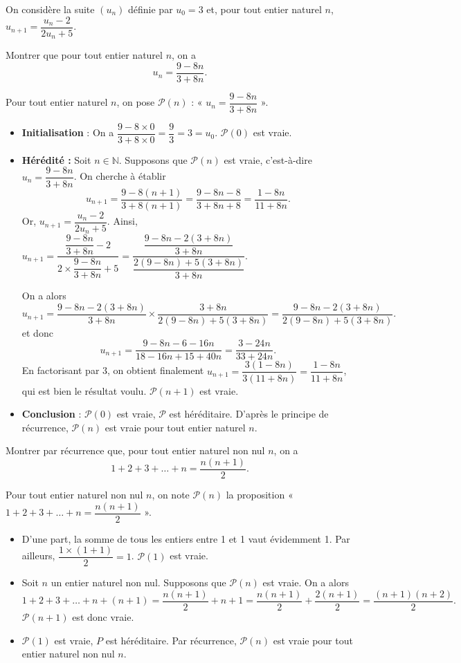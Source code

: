 \documentclass[11pt,fleqn]{book} %
\begin{document}
\begin{exercise}
On considère la suite \((u_n)\) définie par \(u_0=3\) et, pour tout entier naturel \(n\), \(u_{n+1}=\dfrac{u_n-2}{2u_n+5}\).

Montrer que pour tout entier naturel \(n\), on a \[u_n = \dfrac{9-8n}{3+8n}.\]\end{exercise}
\begin{solution}Pour tout entier naturel \(n\), on pose \(\mathcal{P}(n)\) : « \(u_n =\dfrac{9-8n}{3+8n}\) ».
\begin{itemize} \item \textbf{Initialisation} : On a \(\dfrac{9-8 \times 0}{3+8 \times 0}=\dfrac{9}{3}=3=u_0\). \(\mathcal{P}(0)\) est vraie.
\item\textbf{Hérédité :} Soit \(n\in\mathbb{N}\). Supposons que \(\mathcal{P}(n)\) est vraie, c'est-à-dire \(u_n =\dfrac{9-8n}{3+8n}\). On cherche à établir
\[u_{n+1}=\dfrac{9-8(n+1)}{3+8(n+1)}=\dfrac{9-8n-8}{3+8n+8}=\dfrac{1-8n}{11+8n}.\]
Or, \(u_{n+1}=\dfrac{u_n-2}{2u_n+5}\). Ainsi, $u_{n+1}=\dfrac{\dfrac{9-8n}{3+8n}-2}{2 \times \dfrac{9-8n}{3+8n} +5} = \dfrac{\dfrac{9-8n-2(3+8n)}{3+8n}}{\dfrac{2(9-8n)+5(3+8n)}{3+8n}}$.

On a alors
\[u_{n+1}=\dfrac{9-8n-2(3+8n)}{3+8n} \times \dfrac{3+8n}{2(9-8n)+5(3+8n)}=\dfrac{9-8n-2(3+8n)}{2(9-8n)+5(3+8n)}.\]
et donc
\[u_{n+1}=\dfrac{9-8n-6-16n}{18-16n+15+40n}=\dfrac{3-24n}{33+24n}.\]
En factorisant par 3, on obtient finalement $u_{n+1}=\dfrac{3(1-8n)}{3(11+8n)}=\dfrac{1-8n}{11+8n}$, qui est bien le résultat voulu. \(\mathcal{P}(n+1)\) est vraie.
\item \textbf{Conclusion} :  \(\mathcal{P}(0)\) est vraie, \(\mathcal{P}\) est héréditaire. D'après le principe de récurrence, \(\mathcal{P}(n)\) est vraie pour tout entier naturel \(n\).\end{itemize}\end{solution}


\begin{exercise}
Montrer par récurrence que, pour tout entier naturel non nul $n$, on a \[1+2+3+\ldots + n=\dfrac{n(n+1)}{2}.\] \end{exercise}
\begin{solution}Pour tout entier naturel non nul $n$, on note $\mathcal{P}(n)$ la proposition  « $1+2+3+\ldots + n=\dfrac{n(n+1)}{2}$ ».
\begin{itemize}
\item D'une part, la somme de tous les entiers entre 1 et 1 vaut évidemment 1. Par ailleurs, $\dfrac{1\times (1+1)}{2}=1$. $\mathcal{P}(1)$ est vraie.
\item Soit $n$ un entier naturel non nul. Supposons que $\mathcal{P}(n)$ est vraie. On a alors
\[1+2+3+\ldots +n+(n+1) = \dfrac{n(n+1)}{2}+n+1=\dfrac{n(n+1)}{2}+\dfrac{2(n+1)}{2}=\dfrac{(n+1)(n+2)}{2}.\]
$\mathcal{P}(n+1)$ est donc vraie.
\item $\mathcal{P}(1)$ est vraie, $P$ est héréditaire. Par récurrence, $\mathcal{P}(n)$ est vraie pour tout entier naturel non nul $n$.\end{itemize}\end{solution}
\end{document}
